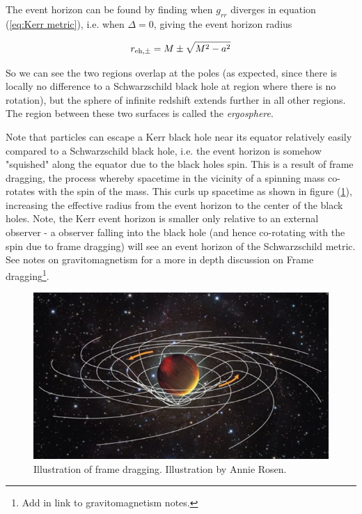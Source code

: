 The event horizon can be found by finding when $g_{rr}$ diverges in equation (\ref{eq:Kerr metric}), i.e. when $\Delta = 0$, giving the event horizon radius

\begin{equation}
    r_{\rm{eh,}\pm} = M \pm \sqrt{M^2 - a^2}
\end{equation}\label{eq:Kerr event horizon radius}

So we can see the two regions overlap at the poles (as expected, since there is locally no difference to a Schwarzschild black hole at region where there is no rotation), but the sphere of infinite redshift extends further in all other regions. The region between these two surfaces is called the \textit{ergosphere}.

Note that particles can escape a Kerr black hole near its equator relatively easily compared to a Schwarzschild black hole, i.e. the event horizon is somehow "squished" along the equator due to the black holes spin. This is a result of frame dragging, the process whereby spacetime in the vicinity of a spinning mass co-rotates with the spin of the mass. This curls up spacetime as shown in figure (\ref{fig:Frame_dragging_img}), increasing the effective radius from the event horizon to the center of the black holes. Note, the Kerr event horizon is smaller only relative to an external observer - a observer falling into the black hole (and hence co-rotating with the spin due to frame dragging)  will see an event horizon of the Schwarzschild metric. See notes on gravitomagnetism for a more in depth discussion on Frame dragging\footnote{Add in link to gravitomagnetism notes.}.

\begin{figure}
    \centering
    \includegraphics{particle_orbits/frame_dragging_img.jpg}
    \caption{Illustration of frame dragging. Illustration by Annie Rosen.}
    \label{fig:Frame_dragging_img}
\end{figure}


